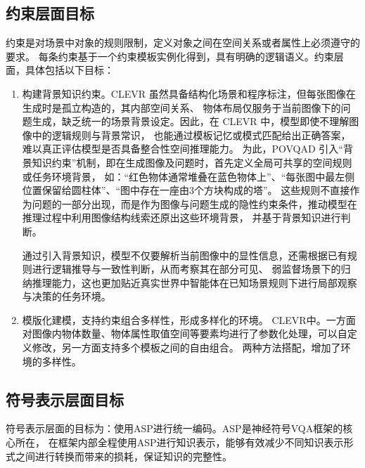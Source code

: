 \subsection{约束层面目标}
约束是对场景中对象的规则限制，定义对象之间在空间关系或者属性上必须遵守的要求。
每条约束基于一个约束模板实例化得到，具有明确的逻辑语义。约束层面，具体包括以下目标：
\begin{enumerate}[nosep]
\item 构建背景知识约束。CLEVR 虽然具备结构化场景和程序标注，但每张图像在生成时是孤立构造的，其内部空间关系、
物体布局仅服务于当前图像下的问题生成，缺乏统一的场景背景设定。因此，在 CLEVR 中，模型即使不理解图像中的逻辑规则与背景常识，
也能通过模板记忆或模式匹配给出正确答案，难以真正评估模型是否具备整合性空间推理能力。
为此，POVQAD 引入“背景知识约束”机制，即在生成图像及问题时，首先定义全局可共享的空间规则或任务环境背景，
如：“红色物体通常堆叠在蓝色物体上”、“每张图中最左侧位置保留给圆柱体”、“图中存在一座由3个方块构成的塔”。
这些规则不直接作为问题的一部分出现，而是作为图像与问题生成的隐性约束条件，推动模型在推理过程中利用图像结构线索还原出这些环境背景，
并基于背景知识进行判断。

通过引入背景知识，模型不仅要解析当前图像中的显性信息，还需根据已有规则进行逻辑推导与一致性判断，从而考察其在部分可见、
弱监督场景下的归纳推理能力，这也更加贴近真实世界中智能体在已知场景规则下进行局部观察与决策的任务环境。
\item 模版化建模，支持约束组合多样性，形成多样化的环境。
CLEVR中。一方面对图像内物体数量、物体属性取值空间等要素均进行了参数化处理，可以自定义修改，另一方面支持多个模板之间的自由组合。
两种方法搭配，增加了环境的多样性。
\end{enumerate}
\subsection{符号表示层面目标}
符号表示层面的目标为：使用ASP进行统一编码。ASP是神经符号VQA框架的核心所在，
在框架内部全程使用ASP进行知识表示，能够有效减少不同知识表示形式之间进行转换而带来的损耗，保证知识的完整性。
